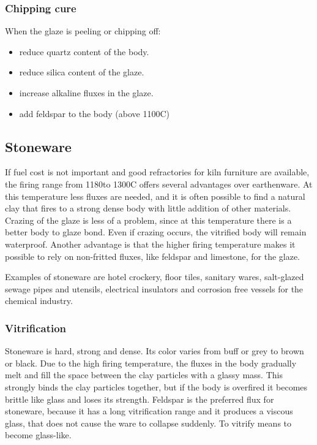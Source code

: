 \subsubsection{Chipping cure}
When the glaze is peeling or chipping off:
\begin{itemize}
\item reduce quartz content of the body.
\item reduce silica content of the glaze.
\item increase alkaline fluxes in the glaze.
\item add feldspar to the body (above 1100\degree C)
\end{itemize}
\subsection{Stoneware}
If fuel cost is not important and good refractories for kiln furniture are 
available, the firing range from 1180\degree to 1300\degree C offers several 
advantages over earthenware. At this temperature less fluxes are needed, and it 
is often possible to find a natural clay that fires to a strong dense body with 
little addition of other materials. Crazing of the glaze is less of a problem, 
since at this temperature there is a better body to glaze bond. Even if crazing 
occurs, the vitrified body will remain waterproof. Another advantage is that 
the higher firing temperature makes it possible to rely on non-fritted fluxes, 
like feldspar and limestone, for the glaze.

Examples of stoneware are hotel crockery, floor tiles, sanitary wares, 
salt-glazed sewage pipes and utensils, electrical insulators and corrosion free 
vessels for the chemical industry.
\subsubsection{Vitrification}
Stoneware is hard, strong and dense. Its color varies from buff or grey to 
brown or black. Due to the high firing temperature, the fluxes in the body 
gradually melt and fill the space between the clay particles with a glassy 
mass. This strongly binds the clay particles together, but if the body is 
overfired it becomes brittle like glass and loses its strength. Feldspar is the 
preferred flux for stoneware, because it has a long vitrification range and it 
produces a viscous glass, that does not cause the ware to collapse suddenly. To 
vitrify means to become glass-like.
